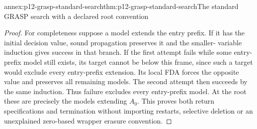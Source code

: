 \begin{annexitem}{annex:p12-grasp-standard-search}{thm:p12-grasp-standard-search}{The standard GRASP search with a declared root convention}
\begin{proof}
For completeness suppose a model extends the entry prefix.  If it has the
initial decision value, sound propagation preserves it and the smaller-
variable induction gives success in that branch.  If the first attempt
fails while some entry-prefix model still exists, its target cannot be below
this frame, since such a target would exclude every entry-prefix extension.
Its local FDA forces the opposite value and preserves all remaining models.
The second attempt then succeeds by the same induction.  Thus failure
excludes every entry-prefix model.  At the root these are precisely the
models extending \(A_0\).  This proves both return specifications and
termination without importing restarts, selective deletion or an unexplained
zero-based wrapper erasure convention.
\end{proof}
\end{annexitem}

